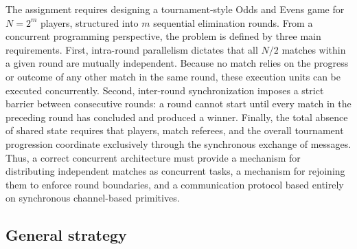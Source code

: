 \documentclass[11pt,a4paper]{article}
\begin{document}
The assignment requires designing a tournament-style Odds and Evens game for $N = 2^m$ players, structured into $m$ sequential elimination rounds. From a concurrent programming perspective, the problem is defined by three main requirements. First, intra-round parallelism dictates that all $N/2$ matches within a given round are mutually independent. Because no match relies on the progress or outcome of any other match in the same round, these execution units can be executed concurrently. Second, inter-round synchronization imposes a strict barrier between consecutive rounds: a round cannot start until every match in the preceding round has concluded and produced a winner. Finally, the total absence of shared state requires that players, match referees, and the overall tournament progression coordinate exclusively through the synchronous exchange of messages. Thus, a correct concurrent architecture must provide a mechanism for distributing independent matches as concurrent tasks, a mechanism for rejoining them to enforce round boundaries, and a communication protocol based entirely on synchronous channel-based primitives.

\subsection{General strategy}
\end{document}
